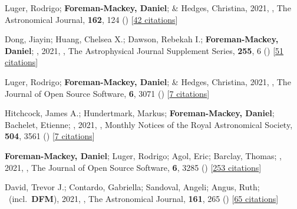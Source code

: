 \item[{\color{numcolor}\scriptsize70}] Luger, Rodrigo; \textbf{Foreman-Mackey, Daniel}; \& Hedges, Christina, 2021, , The Astronomical Journal, \textbf{162}, 124 () [\href{https://ui.adsabs.harvard.edu/abs/2021AJ....162..124L}{42 citations}]

\item[{\color{numcolor}\scriptsize69}] Dong, Jiayin; Huang, Chelsea X.; Dawson, Rebekah I.; \textbf{Foreman-Mackey, Daniel}; \etal, 2021, , The Astrophysical Journal Supplement Series, \textbf{255}, 6 () [\href{https://ui.adsabs.harvard.edu/abs/2021ApJS..255....6D}{51 citations}]

\item[{\color{numcolor}\scriptsize68}] Luger, Rodrigo; \textbf{Foreman-Mackey, Daniel}; \& Hedges, Christina, 2021, , The Journal of Open Source Software, \textbf{6}, 3071 () [\href{https://ui.adsabs.harvard.edu/abs/2021JOSS....6.3071L}{7 citations}]

\item[{\color{numcolor}\scriptsize67}] Hitchcock, James A.; Hundertmark, Markus; \textbf{Foreman-Mackey, Daniel}; Bachelet, Etienne; \etal, 2021, , Monthly Notices of the Royal Astronomical Society, \textbf{504}, 3561 () [\href{https://ui.adsabs.harvard.edu/abs/2021MNRAS.504.3561H}{7 citations}]

\item[{\color{numcolor}\scriptsize66}] \textbf{Foreman-Mackey, Daniel}; Luger, Rodrigo; Agol, Eric; Barclay, Thomas; \etal, 2021, , The Journal of Open Source Software, \textbf{6}, 3285 () [\href{https://ui.adsabs.harvard.edu/abs/2021JOSS....6.3285F}{253 citations}]

\item[{\color{numcolor}\scriptsize65}] David, Trevor J.; Contardo, Gabriella; Sandoval, Angeli; Angus, Ruth; \etal\ (incl.\ \textbf{DFM}), 2021, , The Astronomical Journal, \textbf{161}, 265 () [\href{https://ui.adsabs.harvard.edu/abs/2021AJ....161..265D}{65 citations}]

